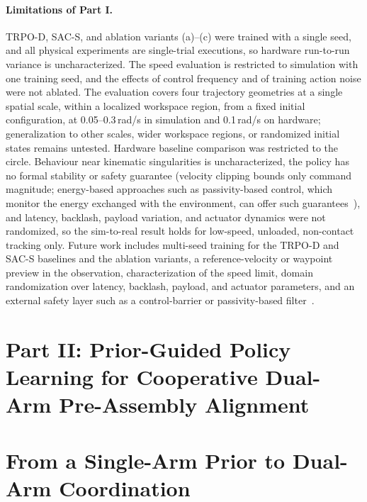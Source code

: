 \paragraph{Limitations of Part I.}
TRPO-D, SAC-S, and ablation variants (a)--(c) were trained with a single seed, and all physical
experiments are single-trial executions, so hardware run-to-run variance is uncharacterized. The
speed evaluation is restricted to simulation with one training seed, and the effects of control
frequency and of training action noise were not ablated. The evaluation covers four trajectory
geometries at a single spatial scale, within a localized workspace region, from a fixed initial
configuration, at 0.05--0.3\,rad/s in simulation and 0.1\,rad/s on hardware; generalization to other
scales, wider workspace regions, or randomized initial states remains untested. Hardware baseline
comparison was restricted to the circle. Behaviour near kinematic singularities is uncharacterized,
the policy has no formal stability or safety guarantee (velocity clipping bounds only command
magnitude; energy-based approaches such as passivity-based control, which monitor the energy
exchanged with the environment, can offer such guarantees~\citep{khan2025quantum}), and latency,
backlash, payload variation, and actuator dynamics were not randomized, so the sim-to-real result
holds for low-speed, unloaded, non-contact tracking only. Future work includes multi-seed training
for the TRPO-D and SAC-S baselines and the ablation variants, a reference-velocity or waypoint
preview in the observation, characterization of the speed limit, domain randomization over latency,
backlash, payload, and actuator parameters, and an external safety layer such as a control-barrier
or passivity-based filter~\citep{khan2025quantum}.

\section*{Part II: Prior-Guided Policy Learning for Cooperative Dual-Arm Pre-Assembly Alignment}

\section{From a Single-Arm Prior to Dual-Arm Coordination}\label{sec:alpha_formulation}

